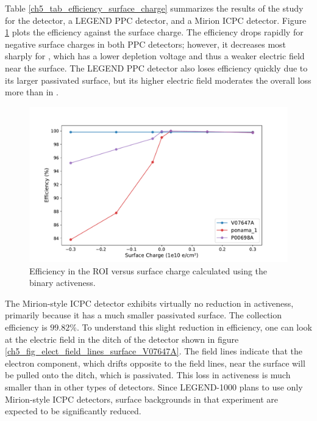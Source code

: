Table \ref{ch5_tab_efficiency_surface_charge} summarizes the results of the study for the {\ponama} detector, a LEGEND PPC detector, and a Mirion ICPC detector. Figure \ref{fig:efficiency_sc_plot} plots the efficiency against the surface charge. The efficiency drops rapidly for negative surface charges in both PPC detectors; however, it decreases most sharply for {\ponama}, which has a lower depletion voltage and thus a weaker electric field near the surface. The LEGEND PPC detector also loses efficiency quickly due to its larger passivated surface, but its higher electric field moderates the overall loss more than in {\ponama}.

\begin{figure}%
\centering
\includegraphics[trim={1.2cm 0.3cm 2cm 1.8cm},clip,width=\linewidth]{ch5/figs/efficiency_0nbb.pdf}
\caption{Efficiency in the ROI versus surface charge calculated using the binary activeness.}
\label{fig:efficiency_sc_plot}
\end{figure}

The Mirion-style ICPC detector exhibits virtually no reduction in activeness, primarily because it has a much smaller passivated surface. The collection efficiency is $99.82\%$. To understand this slight reduction in efficiency, one can look at the electric field in the ditch of the detector shown in figure \ref{ch5_fig_elect_field_lines_surface_V07647A}. The field lines indicate that the electron component, which drifts opposite to the field lines, near the surface will be pulled onto the ditch, which is passivated. This loss in activeness is much smaller than in other types of detectors. Since LEGEND-1000 plans to use only Mirion-style ICPC detectors, surface backgrounds in that experiment are expected to be significantly reduced.

